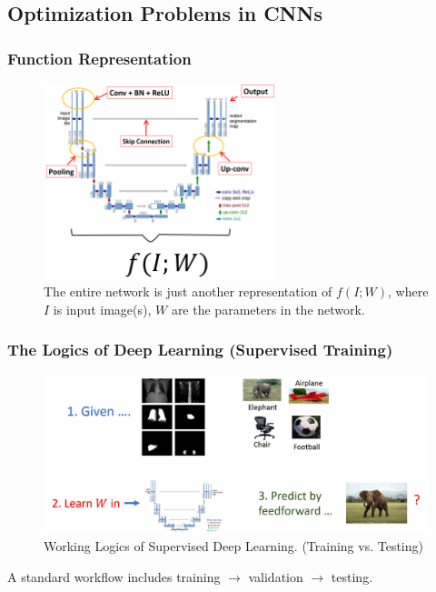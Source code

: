 \documentclass[10pt]{beamer}
\begin{document}
\subsection{Optimization Problems in CNNs}
\begin{frame}
\frametitle{Function Representation}
	\begin{figure}[H]
	\centerline{
		\includegraphics[width=0.6\textwidth]{optimization_fx.png}
	}
	\caption{The entire network is just another representation of $f(I; W)$, where $I$ is input image(s), $W$ are the parameters in the network.}
	\end{figure}
\end{frame}


\begin{frame}
\frametitle{The Logics of Deep Learning (Supervised Training)}
	\begin{figure}[H]
	\centerline{
		\includegraphics[width=1\textwidth]{logics.png}
	}
\caption{Working Logics of Supervised Deep Learning. (Training vs. Testing)}
	\end{figure}

A standard workflow includes training $\rightarrow$ validation $\rightarrow$ testing.
\end{frame}

\end{document}
